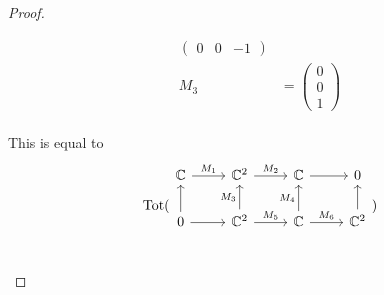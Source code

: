 \begin{proof}
\begin{enumerate}[label = (\roman*)]
\begin{align*}
\begin{pmatrix}
0 & 0 & -1 
\end{pmatrix}\\
M_3 &= 
\begin{pmatrix} 
0 \\ 
0 \\ 
1 
\end{pmatrix}
\end{align*}
\\ This is equal to
\[
\operatorname{Tot}(
\begin{tikzcd}
\C \arrow[r,"M_1"]& \C^2 \arrow[r,"M_2"] &\C \arrow[r] & 0\\
0 \arrow[u]\arrow[r]& \C^2 \arrow[u,"M_3"]\arrow[r, "M_5"] &\C\arrow[u, "M_4"]\arrow[r, "M_6"] & \C^2 \arrow[u]\\
\end{tikzcd}
)
\]


\end{enumerate}
\end{proof}
